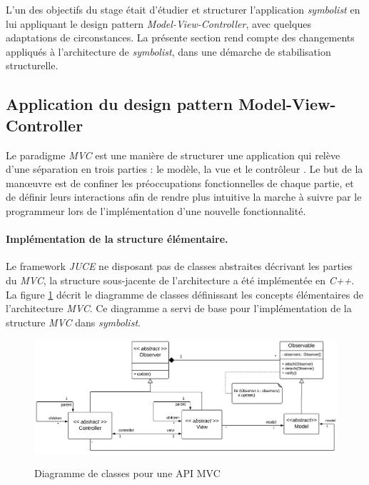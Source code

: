 L'un des objectifs du stage était d'étudier et structurer l'application \textit{symbolist} en lui appliquant le design pattern \textit{Model-View-Controller}, avec quelques adaptations de circonstances.
La présente section rend compte des changements appliqués à l'architecture de \textit{symbolist}, dans une démarche de stabilisation structurelle.

\subsection{Application du design pattern Model-View-Controller}
\label{subsec:applicationDuMVC}
Le \og paradigme \fg \textit{MVC} est une manière de structurer une application qui relève d'une séparation en trois parties : le modèle, la vue et le contrôleur \cite{krasner1988}. Le but de la manœuvre est de confiner les préoccupations fonctionnelles de chaque partie, et de définir leurs interactions afin de rendre plus intuitive la marche à suivre par le programmeur lors de l'implémentation d'une nouvelle fonctionnalité.

\paragraph{Implémentation de la structure élémentaire.} Le framework \textit{JUCE} ne disposant pas de classes abstraites décrivant les parties du \textit{MVC}, la structure sous-jacente de l'architecture a été implémentée en \textit{C++}. La figure \ref{fig:mvcApi} décrit le diagramme de classes définissant les concepts élémentaires de l'architecture \textit{MVC}. Ce diagramme a servi de base pour l'implémentation de la structure \textit{MVC} dans \textit{symbolist}.

\begin{figure}[H]
	\centering
	\includegraphics[keepaspectratio=true, width=\textwidth]{ArchitectureLogicielle/i/mvcApi.png}
	\caption{Diagramme de classes pour une API MVC}
	\label{fig:mvcApi}
	\small
	\it
\end{figure}

